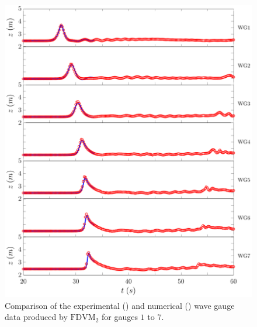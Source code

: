 \begin{figure}
	\centering
	\includegraphics[width=\textwidth]{./chp6/figures/Experiment/Roeber/Trial8/FDVM/LongWGs1.pdf}
	\caption{Comparison of the experimental () and numerical ({\color{blue}\solidrule}) wave gauge data produced by $\text{FDVM}_2$ for gauges $1$ to $7$.}
	\label{fig:Roeber8WG1to7FDVM}
\end{figure}
